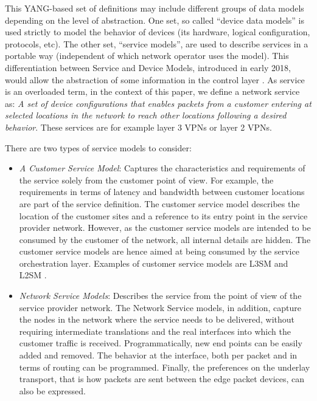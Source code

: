 \documentclass[a4paper,fleqn]{cas-dc}
\begin{document}
This YANG-based set of definitions may include different groups of data models depending on the level of abstraction. One set, so called “device data models” is used strictly to model the behavior of devices (its hardware, logical configuration, protocols, etc). The other set, “service models”, are used to describe services in a portable way (independent of which network operator uses the model). This differentiation between Service and Device Models, introduced in early 2018, would allow the abstraction of some information in the control layer \cite{wu2017service}. As service is an overloaded term, in the context of this paper, we define a network service as: \textit{A set of device configurations that enables packets from a customer entering at selected locations in the network to reach other locations following a desired behavior}. These services are for example layer 3 VPNs or layer 2 VPNs. 

There are two types of service models to consider:
\begin{itemize}
\item 	\textit{A Customer Service Model}: Captures the characteristics and requirements of the service solely from the customer point of view. For example, the requirements in terms of latency and bandwidth between customer locations are part of the service definition. The customer service model describes the location of the customer sites and a reference to its entry point in the service provider network. However, as the customer service models are intended to be consumed by the customer of the network, all internal details are hidden. The customer service models are hence aimed at being consumed by the service orchestration layer. Examples of customer service models are L3SM \cite{rosen2006rfc} and L2SM \cite{wen2018yang}.

\item 	\textit{Network Service Models}:  Describes the service from the point of view of the service provider network. The Network Service models, in addition, capture the nodes in the network where the service needs to be delivered, without requiring intermediate translations and the real interfaces into which the customer traffic is received. Programmatically, new end points can be easily added and removed. The behavior at the interface, both per packet and in terms of routing can be programmed. Finally, the preferences on the underlay transport, that is how packets are sent between the edge packet devices, can also be expressed.
\end{itemize}
\end{document}
